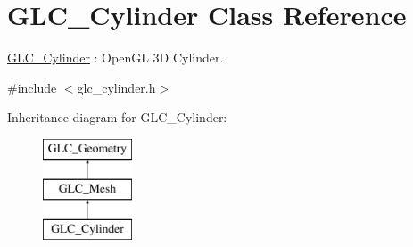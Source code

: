 \hypertarget{class_g_l_c___cylinder}{\section{G\-L\-C\-\_\-\-Cylinder Class Reference}
\label{class_g_l_c___cylinder}
}


\hyperlink{class_g_l_c___cylinder}{G\-L\-C\-\_\-\-Cylinder} \-: Open\-G\-L 3\-D Cylinder.  




{\ttfamily \#include $<$glc\-\_\-cylinder.\-h$>$}

Inheritance diagram for G\-L\-C\-\_\-\-Cylinder\-:\begin{figure}[H]
\begin{center}
\leavevmode
\includegraphics[height=3.000000cm]{class_g_l_c___cylinder}
\end{center}
\end{figure}

